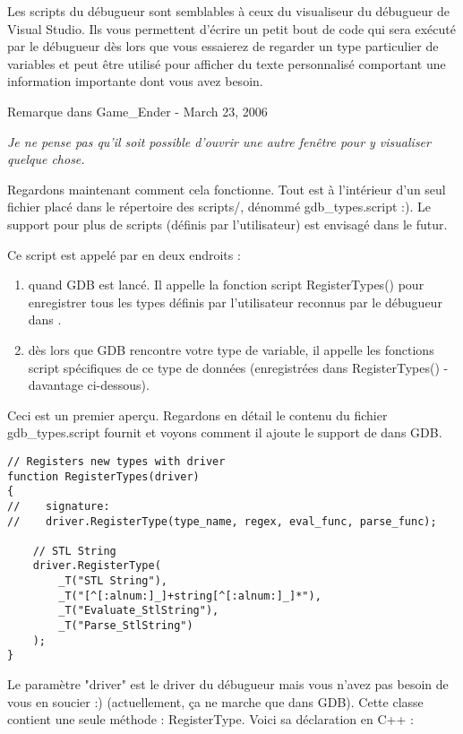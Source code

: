 Les scripts du débugueur sont semblables à ceux du visualiseur du débugueur de Visual Studio. Ils vous permettent d'écrire un petit bout de code qui sera exécuté par le débugueur dès lors que vous essaierez de regarder un type particulier de variables et peut être utilisé pour afficher du texte personnalisé comportant une information importante dont vous avez besoin.

Remarque dans Game\_Ender - March 23, 2006

\textit{Je ne pense pas qu'il soit possible d'ouvrir une autre fenêtre pour y visualiser quelque chose.}

Regardons maintenant comment cela fonctionne. Tout est à l'intérieur d'un seul fichier placé dans le répertoire des scripts/, dénommé gdb\_types.script :). Le support pour plus de scripts (définis par l'utilisateur) est envisagé dans le futur.


Ce script est appelé par \codeblocks en deux endroits :
\begin{enumerate}
\item quand GDB est lancé. Il appelle la fonction script RegisterTypes() pour enregistrer tous les types définis par l'utilisateur reconnus par le débugueur dans \codeblocks.
\item dès lors que GDB rencontre votre type de variable, il appelle les fonctions script spécifiques de ce type de données (enregistrées dans RegisterTypes() - davantage ci-dessous).
\end{enumerate}

Ceci est un premier aperçu. Regardons en détail le contenu du fichier gdb\_types.script fournit et voyons comment il ajoute le support de  dans GDB.

\begin{lstlisting}
// Registers new types with driver
function RegisterTypes(driver)
{
//    signature:
//    driver.RegisterType(type_name, regex, eval_func, parse_func); 

    // STL String
    driver.RegisterType(
        _T("STL String"),
        _T("[^[:alnum:]_]+string[^[:alnum:]_]*"),
        _T("Evaluate_StlString"),
        _T("Parse_StlString")
    );
}
\end{lstlisting}

Le paramètre "driver" est le driver du débugueur mais vous n'avez pas besoin de vous en soucier :) (actuellement, ça ne marche que dans GDB). Cette classe contient une seule méthode : RegisterType. Voici sa déclaration en C++ :

